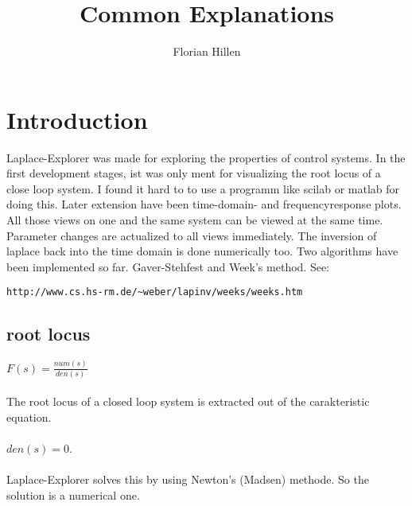 \documentclass[a4paper,12pt]{article}
\title{Common Explanations}
\author{Florian Hillen}
\begin{document}
\section{Introduction}
Laplace-Explorer was made for exploring the properties of control systems. In the first development
stages, ist was only ment for visualizing the root locus of a close loop system. I found it
hard to to use a programm like scilab or matlab for doing this.
Later extension have been time-domain- and frequencyresponse plots.
All those views on one and the same system can be viewed at the same time. Parameter changes are actualized
to all views immediately.
The inversion of laplace back into the time domain is done numerically too. Two algorithms have been implemented
so far. Gaver-Stehfest and Week's method. See:
\begin{lstlisting}
http://www.cs.hs-rm.de/~weber/lapinv/weeks/weeks.htm
\end{lstlisting}

\subsection{root locus}
$F(s) = \frac{num(s)}{den(s)}$\\\\
The root locus of a closed loop system is extracted out of the carakteristic equation.\\\\
$den(s) = 0$.\\\\
Laplace-Explorer solves this by using Newton's (Madsen) methode.
So the solution is a numerical one.
\\
\end{document}
